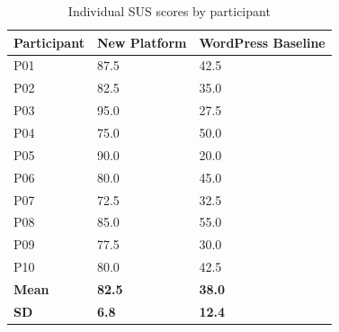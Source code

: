 \begin{table}[H]
  \centering
  \caption{Individual SUS scores by participant}
  \label{tab:sus_individual}
  \begin{tabularx}{\linewidth}{lll}
    \toprule
    \textbf{Participant} & \textbf{New Platform} & \textbf{WordPress Baseline} \\
    \midrule
    P01 & 87.5 & 42.5 \\
    P02 & 82.5 & 35.0 \\
    P03 & 95.0 & 27.5 \\
    P04 & 75.0 & 50.0 \\
    P05 & 90.0 & 20.0 \\
    P06 & 80.0 & 45.0 \\
    P07 & 72.5 & 32.5 \\
    P08 & 85.0 & 55.0 \\
    P09 & 77.5 & 30.0 \\
    P10 & 80.0 & 42.5 \\
    \midrule
    \textbf{Mean} & \textbf{82.5} & \textbf{38.0} \\
    \textbf{SD}   & \textbf{6.8}  & \textbf{12.4} \\
    \bottomrule
  \end{tabularx}
\end{table}
